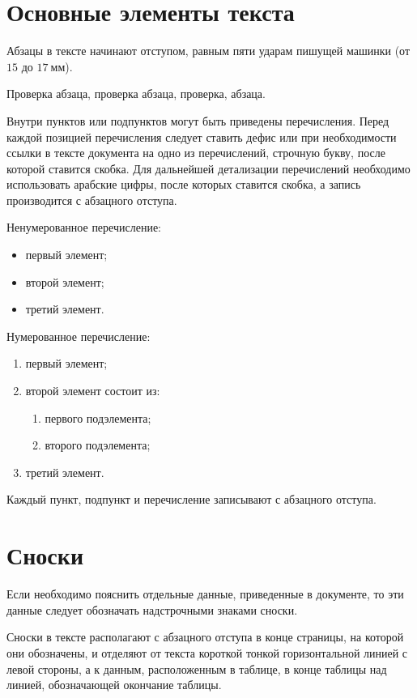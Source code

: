 \section{Основные элементы текста}

\point Абзацы в тексте начинают отступом, равным пяти ударам пишущей
машинки (от $15$ до $17~\text{мм}$).

Проверка абзаца, проверка абзаца, проверка, абзаца.

\point Внутри пунктов или подпунктов могут быть приведены
перечисления.  Перед каждой позицией перечисления следует ставить
дефис или при необходимости ссылки в тексте документа на одно из
перечислений, строчную букву, после которой ставится скобка. Для
дальнейшей детализации перечислений необходимо использовать
арабские цифры, после которых ставится скобка, а запись
производится с абзацного отступа.

\point Ненумерованное перечисление:

\begin{itemize}
\item первый элемент;
\item второй элемент;
\item третий элемент.
\end{itemize}

\point Нумерованное перечисление:

\begin{enumerate}
\item первый элемент;
\item второй элемент состоит из:
  \begin{enumerate}
  \item первого подэлемента;
  \item второго подэлемента;
  \end{enumerate}
\item третий элемент.
\end{enumerate}

\point Каждый пункт, подпункт и перечисление записывают с абзацного
отступа.

\section{Сноски}

\point Если необходимо пояснить отдельные данные, приведенные в
документе, то эти данные следует обозначать надстрочными знаками
сноски.

Сноски в тексте располагают с абзацного отступа в конце страницы, на
которой они обозначены, и отделяют от текста короткой тонкой
горизонтальной линией с левой стороны, а к данным, расположенным в
таблице, в конце таблицы над линией, обозначающей окончание таблицы.

